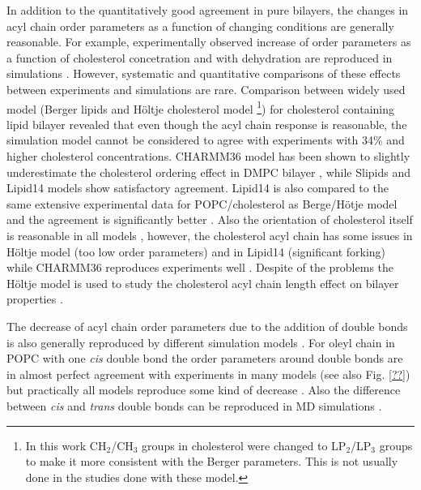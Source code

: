 \documentclass[aps,prl,superscriptaddress,twocolumn]{revtex4}
\begin{document}
In addition to the quantitatively good agreement in pure bilayers, the changes in 
acyl chain order parameters as a function of changing conditions are generally reasonable.
For example, experimentally observed increase of order parameters as a function of cholesterol 
concetration \cite{??} and with dehydration \cite{??} are reproduced in simulations \cite{??}. 
However, systematic and quantitative comparisons of these effects between experiments and simulations are rare.
Comparison between widely used model (Berger lipids \cite{??} and Höltje cholesterol model \cite{??}
\footnote{In this work CH$_2$/CH$_3$ groups in cholesterol were changed to LP$_2$/LP$_3$ groups to make it more consistent with the Berger
parameters. This is not usually done in the studies done with these model.})
for cholesterol containing lipid bilayer revealed that even though the acyl chain response is reasonable,
the simulation model cannot be considered to agree with experiments with 34\% and higher cholesterol concentrations.
CHARMM36 model has been shown to slightly underestimate the cholesterol ordering effect in DMPC bilayer \cite{??},
while Slipids and Lipid14 models show satisfactory agreement. Lipid14 is also compared to the same
extensive experimental data for POPC/cholesterol as Berge/Hötje model and the agreement is significantly better \cite{??}. 
Also the orientation of cholesterol itself is reasonable in all models \cite{??}, however, the cholesterol
acyl chain has some issues in Höltje model (too low order parameters) and in Lipid14 (significant forking) while
CHARMM36 reproduces experiments well \cite{??}. Despite of the problems the Höltje model 
is used to study the cholesterol acyl chain length effect on bilayer properties \cite{??}.  

The decrease of acyl chain order parameters due to the addition of double bonds is also 
generally reproduced by different simulation models \cite{??}. For oleyl chain in POPC 
with one {\it cis} double bond the
order parameters around double bonds are in almost perfect agreement with experiments
in many models \cite{??} (see also Fig. \ref{??}) but practically all models reproduce some
kind of decrease \cite{??}. Also the difference between {\it cis} and {\it trans} double bonds
can be reproduced in MD simulations \cite{??}.
\end{document}
